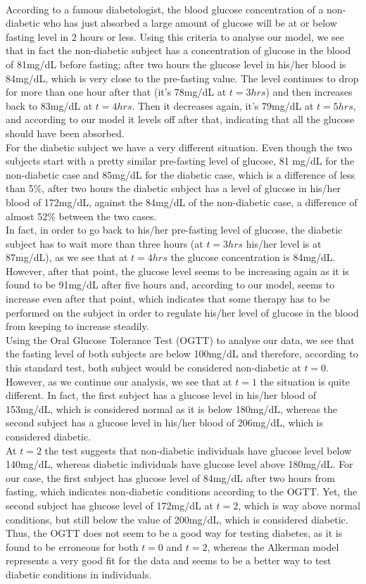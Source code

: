 \\
According to a famous diabetologist, the blood glucose concentration of a non-diabetic who has just absorbed a large amount of glucose will be at or below fasting level in 2 hours or less. Using this criteria to analyse our model, we see that in fact the non-diabetic subject has a concentration of glucose in the blood of 81mg/dL before fasting; after two hours the glucose level in his/her blood is 84mg/dL, which is very close to the pre-fasting value. The level continues to drop for more than one hour after that (it's 78mg/dL at $t=3hrs$) and then increases back to 83mg/dL at $t=4hrs$. Then it decreases again, it's 79mg/dL at $t=5hrs$, and according to our model it levels off after that, indicating that all the glucose should have been absorbed.\\
For the diabetic subject we have a very different situation. Even though the two subjects start with a pretty similar pre-fasting level of glucose, 81 mg/dL for the non-diabetic case and 85mg/dL for the diabetic case, which is a difference of less than 5\%, after two hours the diabetic subject has a level of glucose in his/her blood of 172mg/dL, against the 84mg/dL of the non-diabetic case, a difference of almost 52\% between the two cases.\\
In fact, in order to go back to his/her pre-fasting level of glucose, the diabetic subject has to wait more than three hours (at $t=3hrs$ his/her level is at 87mg/dL), as we see that at $t=4hrs$ the glucose concentration is 84mg/dL. However, after that point, the glucose level seems to be increasing again as it is found to be 91mg/dL after five hours and, according to our model, seems to increase even after that point, which indicates that some therapy has to be performed on the subject in order to regulate his/her level of glucose in the blood from keeping to increase steadily.\\
Using the Oral Glucose Tolerance Test (OGTT) to analyse our data, we see that the fasting level of both subjects are below 100mg/dL and therefore, according to this standard test, both subject would be considered non-diabetic at $t=0$.\\
However, as we continue our analysis, we see that at $t=1$ the situation is quite different. In fact, the first subject has a glucose level in his/her blood of 153mg/dL, which is considered normal as it is below 180mg/dL, whereas the second subject has a glucose level in his/her blood of 206mg/dL, which is considered diabetic.\\
At $t=2$ the test suggests that non-diabetic individuals have glucose level below 140mg/dL, whereas diabetic individuals have glucose level above 180mg/dL. For our case, the first subject has glucose level of 84mg/dL after two hours from fasting, which indicates non-diabetic conditions according to the OGTT. Yet, the second subject has glucose level of 172mg/dL at $t=2$, which is way above normal conditions, but still below the value of 200mg/dL, which is considered diabetic.\\
Thus, the OGTT does not seem to be a good way for testing diabetes, as it is found to be erroneous for both  $t=0$ and $t=2$, whereas the Alkerman model represents a very good fit for the data and seems to be a better way to test diabetic conditions in individuals.